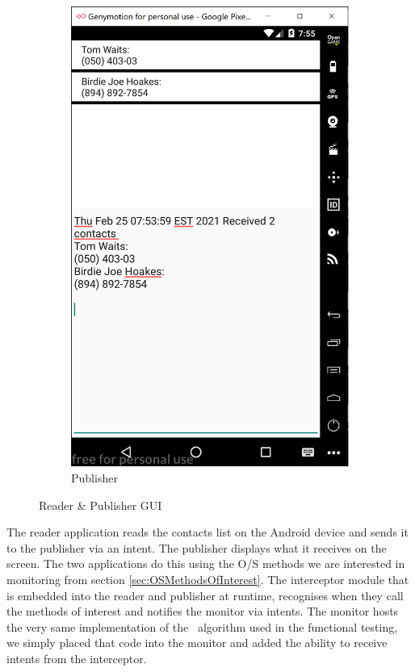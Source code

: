 \begin{figure}[h!]
\begin{subfigure}[h]{0.5\textwidth}
	\includegraphics[height=0.5\textheight]{graphics/Publisher}
	\caption{Publisher}
	\label{fig:publisherGUI}
	\end{subfigure}
\caption{Reader \& Publisher GUI}
\label{fig:readerPublisherGUI}
\end{figure}

The reader application reads the contacts list on the Android device and sends it to the publisher via an intent.  The publisher displays what it receives on the screen. The two applications do this using the O/S methods we are interested in monitoring from section \ref{sec:OSMethodsOfInterest}.  The interceptor module that is embedded into the reader and publisher at runtime, recognises when they call the methods of interest and notifies the monitor via intents.  The monitor hosts the very same implementation of the \RH\ algorithm used in the functional testing, we simply placed that code into the monitor and added the ability to receive intents from the interceptor.


